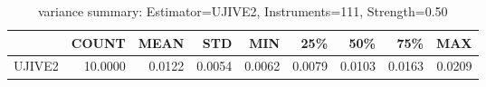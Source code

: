 \begin{table}[ht]
\centering
\caption{variance summary: Estimator=UJIVE2, Instruments=111, Strength=0.50}
\begin{tabular}{lrrrrrrrr}
\toprule
 & COUNT & MEAN & STD & MIN & 25\% & 50\% & 75\% & MAX \\
\midrule
UJIVE2 & 10.0000 & 0.0122 & 0.0054 & 0.0062 & 0.0079 & 0.0103 & 0.0163 & 0.0209 \\
\bottomrule
\end{tabular}
\end{table}
